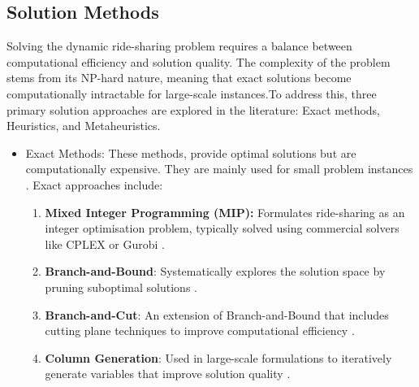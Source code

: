 \subsection{Solution Methods}
\label{solution_methods}
Solving the dynamic ride-sharing problem requires a balance between computational efficiency and solution quality. The complexity of the problem stems from its NP-hard nature, meaning that exact solutions become computationally intractable for large-scale instances.To address this, three primary solution approaches are explored in the literature: Exact methods, Heuristics, and Metaheuristics.
\begin{itemize}
    \item Exact Methods: These methods, provide optimal solutions but are computationally expensive. They are mainly used for small problem instances \cite{cordeau2007dial46, ropke2009branch148}. Exact approaches include:
    \begin{enumerate}
        \item \textbf{Mixed Integer Programming (MIP):} Formulates ride-sharing as an integer optimisation problem, typically solved using commercial solvers like CPLEX or Gurobi \cite{cordeau2007dial46, ropke2009branch148}.
        \item \textbf{Branch-and-Bound}: Systematically explores the solution space by pruning suboptimal solutions \cite{cordeau2007dial46}.
        \item \textbf{Branch-and-Cut}: An extension of Branch-and-Bound that includes cutting plane techniques to improve computational efficiency \cite{ropke2009branch148}.
        \item \textbf{Column Generation}: Used in large-scale formulations to iteratively generate variables that improve solution quality \cite{ghilas2018branch65}.
    \end{enumerate}
    

\end{itemize}
